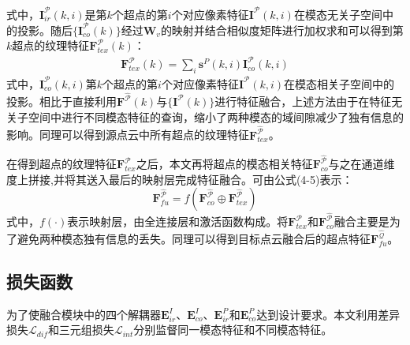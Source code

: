     式中，$\mathbf{I}^{\mathcal{P}}_{ir}(k,i)$是第$k$个超点的第$i$个对应像素特征$\mathbf{I}^{\mathcal{P}}(k,i)$在模态无关子空间中的投影。随后$\{\mathbf{I}^{\mathcal{P}}_{co}(k)\}$经过$\mathbf{W}_v$的映射并结合相似度矩阵进行加权求和可以得到第$k$超点的纹理特征$\mathbf{F}^{\mathcal{P}}_{tex}(k)$：
    \begin{equation}
        \begin{aligned}
            \mathbf{F}^{\mathcal{P}}_{tex}(k) = \sum_i \mathbf{s}^{P}(k,i) \mathbf{I}^{\mathcal{P}}_{co}(k,i)
        \end{aligned}
    \end{equation}
    式中，$\mathbf{I}^{\mathcal{P}}_{co}(k,i)$第$k$个超点的第$i$个对应像素特征$\mathbf{I}^{\mathcal{P}}(k,i)$在模态相关子空间中的投影。相比于直接利用$\mathbf{F}^{\hat{\mathcal{P}}}(k)$与$\{\mathbf{I}^{\mathcal{P}}(k)\}$进行特征融合，上述方法由于在特征无关子空间中进行不同模态特征的查询，缩小了两种模态的域间隙减少了独有信息的影响。同理可以得到源点云中所有超点的纹理特征$\mathbf{F}^{\hat{\mathcal{P}}}_{tex}$。

    在得到超点的纹理特征$\mathbf{F}^{\mathcal{P}}_{tex}$之后，本文再将超点的模态相关特征$\mathbf{F}^{\hat{\mathcal{P}}}_{co}$与之在通道维度上拼接,并将其送入最后的映射层完成特征融合。可由公式(4-5)表示：
    \begin{equation}
        \mathbf{F}^{\hat{\mathcal{P}}}_{fu} = f(\mathbf{F}^{\hat{\mathcal{P}}}_{co} \oplus \mathbf{F}^{\hat{\mathcal{P}}}_{tex})
    \end{equation}
    式中，$f(\cdot)$表示映射层，由全连接层和激活函数构成。将$\mathbf{F}^{\mathcal{P}}_{tex}$和$\mathbf{F}^{\hat{\mathcal{P}}}_{co}$融合主要是为了避免两种模态独有信息的丢失。同理可以得到目标点云融合后的超点特征$\mathbf{F}^{\hat{\mathcal{Q}}}_{fu}$。

    \subsection{损失函数}
    为了使融合模块中的四个解耦器$\mathbf{E}^{I}_{ir}$、$\mathbf{E}^{I}_{co}$、$\mathbf{E}^{P}_{ir}$和$\mathbf{E}^{P}_{co}$达到设计要求。本文利用差异损失$\mathcal{L}_{dif}$和三元组损失$\mathcal{L}_{int}$分别监督同一模态特征和不同模态特征。

